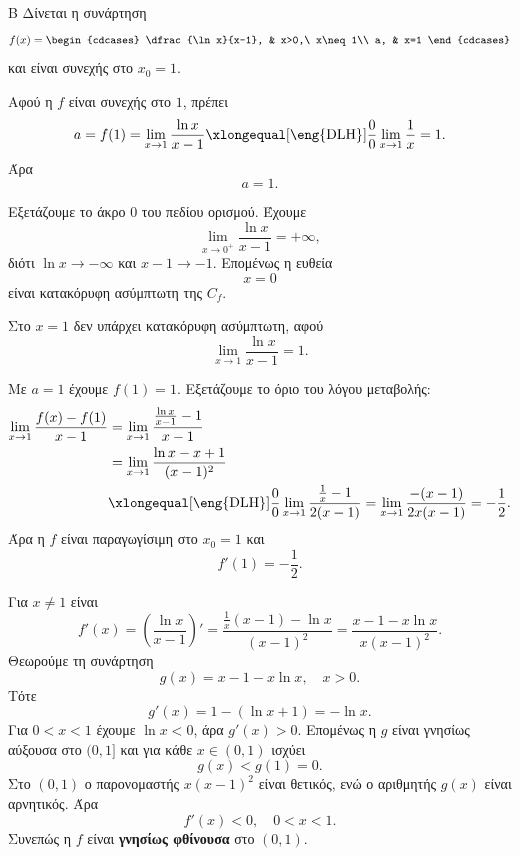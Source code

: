 \begin{thema}{Β}
Δίνεται η συνάρτηση
\[
f(x)=
\begin{cdcases}
\dfrac{\ln x}{x-1}, & x>0,\ x\neq1\\
a, & x=1
\end{cdcases}
\]
και είναι συνεχής στο $x_0=1$.

\begin{erwthma}
\item Αφού η $f$ είναι συνεχής στο $1$, πρέπει
\[
a=f(1)=\lim_{x\to1}\frac{\ln x}{x-1}
\xlongequal[\text{\eng{DLH}}]{\frac{0}{0}}
\lim_{x\to1}\frac{1}{x}=1.
\]
Άρα
\[
a=1.
\]

\item Εξετάζουμε το άκρο $0$ του πεδίου ορισμού. Έχουμε
\[
\lim_{x\to0^+}\frac{\ln x}{x-1}=+\infty,
\]
διότι $\ln x\to-\infty$ και $x-1\to-1$. Επομένως η ευθεία
\[
x=0
\]
είναι κατακόρυφη ασύμπτωτη της $C_f$.

Στο $x=1$ δεν υπάρχει κατακόρυφη ασύμπτωτη, αφού
\[
\lim_{x\to1}\frac{\ln x}{x-1}=1.
\]

\item Με $a=1$ έχουμε $f(1)=1$. Εξετάζουμε το όριο του λόγου μεταβολής:
\begin{align*}
\lim_{x\to1}\frac{f(x)-f(1)}{x-1}
&=\lim_{x\to1}\frac{\frac{\ln x}{x-1}-1}{x-1}\\
&=\lim_{x\to1}\frac{\ln x-x+1}{(x-1)^2}\\
&\xlongequal[\text{\eng{DLH}}]{\frac{0}{0}}
\lim_{x\to1}\frac{\frac{1}{x}-1}{2(x-1)}
=\lim_{x\to1}\frac{-(x-1)}{2x(x-1)}
=-\frac{1}{2}.
\end{align*}
Άρα η $f$ είναι παραγωγίσιμη στο $x_0=1$ και
\[
f'(1)=-\frac{1}{2}.
\]

\item Για $x\neq1$ είναι
\[
f'(x)=\left(\frac{\ln x}{x-1}\right)'
=\frac{\frac{1}{x}(x-1)-\ln x}{(x-1)^2}
=\frac{x-1-x\ln x}{x(x-1)^2}.
\]
Θεωρούμε τη συνάρτηση
\[
g(x)=x-1-x\ln x,\quad x>0.
\]
Τότε
\[
g'(x)=1-(\ln x+1)=-\ln x.
\]
Για $0<x<1$ έχουμε $\ln x<0$, άρα $g'(x)>0$. Επομένως η $g$ είναι γνησίως αύξουσα στο $(0,1]$ και για κάθε $x\in(0,1)$ ισχύει
\[
g(x)<g(1)=0.
\]
Στο $(0,1)$ ο παρονομαστής $x(x-1)^2$ είναι θετικός, ενώ ο αριθμητής $g(x)$ είναι αρνητικός. Άρα
\[
f'(x)<0,\quad 0<x<1.
\]
Συνεπώς η $f$ είναι \textbf{γνησίως φθίνουσα} στο $(0,1)$.
\end{erwthma}
\end{thema}
